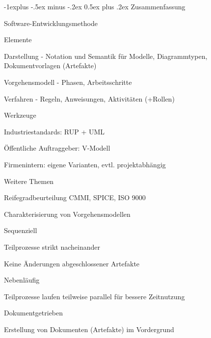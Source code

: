 \documentclass[a4paper]{article}
\makeatletter
\renewcommand{\subsection}{\@startsection{subsection}{2}{0mm}%
                                {-1explus -.5ex minus -.2ex}%
                                {0.5ex plus .2ex}%
                                {\normalfont\normalsize\bfseries}}
\makeatother
\begin{document}
\begin{multicols}{3}
  \subsection{Zusammenfassung}
  \begin{itemize*}
    \item Software-Entwicklungsmethode
    \begin{itemize*}
      \item Elemente
      \begin{itemize*}
        \item Darstellung - Notation und Semantik für Modelle, Diagrammtypen, Dokumentvorlagen (Artefakte)
        \item Vorgehensmodell - Phasen, Arbeitsschritte
        \item Verfahren - Regeln, Anweisungen, Aktivitäten (+Rollen)
        \item Werkzeuge
      \end{itemize*}
      \item Industriestandards: RUP + UML
      \item Öffentliche Auftraggeber: V-Modell
      \item Firmenintern: eigene Varianten, evtl. projektabhängig
      \item Weitere Themen
      \begin{itemize*}
        \item Reifegradbeurteilung CMMI, SPICE, ISO 9000
      \end{itemize*}
    \end{itemize*}
    \item Charakterisierung von Vorgehensmodellen
    \begin{itemize*}
      \item Sequenziell
      \begin{itemize*}
        \item Teilprozesse strikt nacheinander
        \item Keine Änderungen abgeschlossener Artefakte
      \end{itemize*}
      \item Nebenläufig
      \begin{itemize*}
        \item Teilprozesse laufen teilweise parallel für bessere Zeitnutzung
      \end{itemize*}
      \item Dokumentgetrieben
      \begin{itemize*}
        \item Erstellung von Dokumenten (Artefakte) im Vordergrund

\end{itemize*}
\end{itemize*}
\end{itemize*}
\end{multicols}
\end{document}
